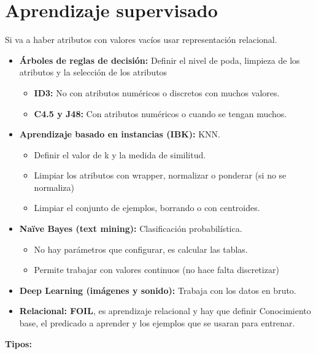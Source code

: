 \documentclass[12pt, twoside, openright]{report} %
\begin{document}
\section{Aprendizaje supervisado}
Si va a haber atributos con valores vacíos usar representación relacional.
\begin{itemize}
	\item \textbf{Árboles de reglas de decisión:} Definir el nivel de poda, limpieza de los atributos y la selección de los atributos
	      \begin{itemize}
		      \item \textbf{ID3:} No con atributos numéricos o discretos con muchos valores.
		      \item \textbf{C4.5 y J48:} Con atributos numéricos o cuando se tengan muchos.
	      \end{itemize}
	\item \textbf{Aprendizaje basado en instancias (IBK):} KNN.
	      \begin{itemize}
		      \item Definir el valor de k y la medida de similitud.
		      \item Limpiar los atributos con wrapper, normalizar o ponderar (si no se normaliza)
		      \item Limpiar el conjunto de ejemplos, borrando o con centroides.
	      \end{itemize}
	\item \textbf{Naïve Bayes (text mining):} Clasificación probabilística.
	      \begin{itemize}
		      \item No hay parámetros que configurar, es calcular las tablas.
		      \item Permite trabajar con valores continuos (no hace falta discretizar)
	      \end{itemize}
	\item \textbf{Deep Learning (imágenes y sonido):} Trabaja con los datos en bruto.
	\item \textbf{Relacional: FOIL}, es aprendizaje relacional y hay que definir Conocimiento base, el predicado a aprender y los ejemplos que se usaran para entrenar.
\end{itemize}
\textbf{Tipos:}
\end{document}

